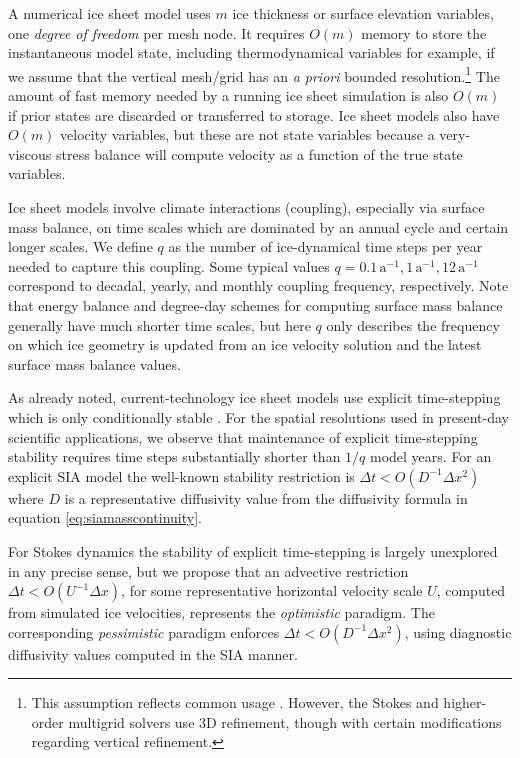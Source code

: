 \documentclass[twocolumn,letterpaper]{igs}
\begin{document}
A numerical ice sheet model uses $m$ ice thickness or surface elevation variables, one \emph{degree of freedom} per mesh node.  It requires $O(m)$ memory to store the instantaneous model state, including thermodynamical variables for example, if we assume that the vertical mesh/grid has an \emph{a priori} bounded resolution.\footnote{This assumption reflects common usage \citep[for example]{Aschwandenetal2019,Brinkerhoffetal2017,Hoffmanetal2018}.  However, the \cite{IsaacStadlerGhattas2015} Stokes and \cite{BrownSmithAhmadia2013} higher-order multigrid solvers use 3D refinement, though with certain modifications regarding vertical refinement.}  The amount of fast memory needed by a running ice sheet simulation is also $O(m)$ if prior states are discarded or transferred to storage.  Ice sheet models also have $O(m)$ velocity variables, but these are not state variables because a very-viscous stress balance will compute velocity as a function of the true state variables.
 
Ice sheet models involve climate interactions (coupling), especially via surface mass balance, on time scales which are dominated by an annual cycle and certain longer scales.  We define $q$ as the number of ice-dynamical time steps per year needed to capture this coupling.  Some typical values $q=0.1 \,\text{a}^{-1}, 1 \,\text{a}^{-1}, 12 \,\text{a}^{-1}$ correspond to decadal, yearly, and monthly coupling frequency, respectively.  Note that energy balance and degree-day schemes for computing surface mass balance generally have much shorter time scales, but here $q$ only describes the frequency on which ice geometry is updated from an ice velocity solution and the latest surface mass balance values.

As already noted, current-technology ice sheet models use explicit time-stepping which is only conditionally stable \citep{LeVeque2007}.  For the spatial resolutions used in present-day scientific applications, we observe that maintenance of explicit time-stepping stability requires time steps substantially shorter than $1/q$ model years.  For an explicit SIA model the well-known stability restriction is $\Delta t < O(D^{-1} \Delta x^2)$ \citep{Bueleretal2005,HindmarshPayne1996} where $D$ is a representative diffusivity value from the diffusivity formula in equation \eqref{eq:siamasscontinuity}.

For Stokes dynamics the stability of explicit time-stepping is largely unexplored in any precise sense, but we propose that an advective restriction $\Delta t < O(U^{-1} \Delta x)$, for some representative horizontal velocity scale $U$, computed from simulated ice velocities, represents the \emph{optimistic} paradigm.  The corresponding \emph{pessimistic} paradigm enforces $\Delta t < O(D^{-1} \Delta x^2)$, using diagnostic diffusivity values computed in the SIA manner.
\end{document}

